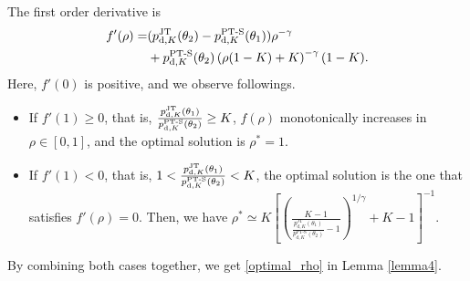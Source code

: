 \documentclass[twocolumns,10pt]{IEEEtran}
\begin{document}
The first order derivative is
\begin{equation}
\begin{split}
f'(\rho)=&(p_{\textnormal{d},K}^{\text{JT}}  (\theta_2) -p_{\textnormal{d},K}^{\text{PT-S}} (\theta_1) ) \rho^{-\gamma} \\
& + p_{\textnormal{d},K}^{\text{PT-S}} (\theta_2)\left(\rho(1-K)+K\right)^{-\gamma} (1-K).
\end{split}
\end{equation}
Here, $f' (0)$ is positive, and we observe followings.
\begin{itemize}
	\item If $f' (1)\geq0$, that is, $\frac{p_{\textnormal{d},K}^{\text{JT}}  (\theta_1)}{p_{\textnormal{d},K}^{\text{PT-S}} (\theta_2) }\geq K$, $f(\rho)$ monotonically increases in $\rho\in[0,1]$, and the optimal solution is $\rho^{*}=1$.
	\item If $f' (1)<0$, that is, $1<\frac{p_{\textnormal{d},K}^{\text{JT}}  (\theta_1)}{p_{\textnormal{d},K}^{\text{PT-S}}  (\theta_2)} <K$, the optimal solution is the one that satisfies $f'(\rho)=0$. Then, we have $\rho^{*}\simeq  K\left[\left(\frac{K-1}{\frac{p_{\text{d},K}^{\text{JT}} (\theta_1) }{p_{\text{d},K}^{\text{PT-S}} (\theta_2) }-1}\right)^{1/\gamma}+K-1\right]^{-1}
	\label{optimal_percentage}$.
\end{itemize}
By combining both cases together, we get \eqref{optimal_rho} in Lemma \ref{lemma4}.







	
	
\end{document}
